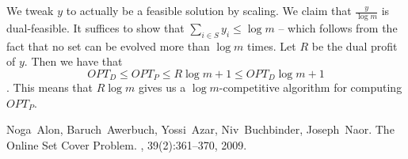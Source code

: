 \documentclass[11pt]{article}
\begin{document}
We tweak $y$ to actually be a feasible solution by scaling. We claim that $\frac{y}{\log m}$ is dual-feasible. It suffices to show that $\sum_{i \in S} y_i \le \log m$ -- which follows from the fact that no set can be evolved more than $\log m$ times. Let $R$ be the dual profit of $y$. Then we have that 
\[OPT_{D} \le OPT_{P} \le R \log m + 1 \le OPT_{D} \log m + 1\]. This means that $R \log m$ gives us a $\log m$-competitive algorithm for computing $OPT_P$. 


\begin{thebibliography}{42}

Noga~Alon, Baruch~Awerbuch, Yossi~Azar, Niv~Buchbinder, Joseph~Naor.
\newblock The Online Set Cover Problem.
, 39(2):361--370, 2009.

\end{thebibliography}
\end{document}
